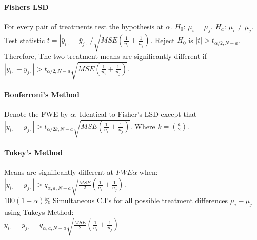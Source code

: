 \documentclass[10pt]{article}
\begin{document}
\paragraph{Fishers LSD} For every pair of treatments test the hypothesis at $\alpha$.  $H_0$: $\mu_i = \mu_j$. $H_a$: $\mu_i \neq \mu_j$. \\
Test statistic $t = \left| \bar{y}_{i \cdot} - \bar{y}_{j \cdot} \right| / \sqrt{MSE \left( \frac{1}{n_i} + \frac{1}{n_j} \right)}$. Reject $H_0$ is $\left| t \right| > t_{\alpha/2, N-a}$.\\
Therefore, The two treatment means are significantly different if $\left| \bar{y}_{i \cdot} - \bar{y}_{j \cdot} \right| > t_{\alpha/2, N-a} \sqrt{MSE \left( \frac{1}{n_i} + \frac{1}{n_j} \right)}$.


\paragraph{Bonferroni's Method} Denote the FWE by $\alpha$. Identical to Fisher's LSD except that \\
$\left| \bar{y}_{i \cdot} - \bar{y}_{j \cdot} \right| > t_{\alpha/2k, N-a} \sqrt{MSE \left( \frac{1}{n_i} + \frac{1}{n_j} \right)}$.
Where $k = \binom{a}{2}$.

\paragraph{Tukey's Method} Means are significantly different at $FWE \alpha$ when:
$\left| \bar{y}_{i \cdot} - \bar{y}_{j \cdot} \right| > q_{\alpha,a, N-a} \sqrt{\frac{MSE}{2} \left( \frac{1}{n_i} + \frac{1}{n_j} \right)}$. \\
$100(1-\alpha)\%$ Simultaneous C.I's for all possible treatment differences $\mu_i - \mu_j$ using Tukeys Method: \\
$\bar{y}_{i \cdot} - \bar{y}_{j \cdot} \pm q_{\alpha,a,N-a} \sqrt{\frac{MSE}{2} \left( \frac{1}{n_i} + \frac{1}{n_j} \right)}$ 
\end{document}
